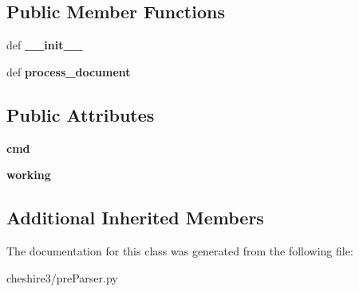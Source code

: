 \subsection*{Public Member Functions}
\begin{DoxyCompactItemize}
\item 
\hypertarget{classcheshire3_1_1pre_parser_1_1_cmd_line_pre_parser_abc296d8b820bf282d1ac0fb5aa224ddd}{def {\bfseries \-\_\-\-\_\-init\-\_\-\-\_\-}}\label{classcheshire3_1_1pre_parser_1_1_cmd_line_pre_parser_abc296d8b820bf282d1ac0fb5aa224ddd}

\item 
\hypertarget{classcheshire3_1_1pre_parser_1_1_cmd_line_pre_parser_a0740fec046170f5ad93fe70a5305cda0}{def {\bfseries process\-\_\-document}}\label{classcheshire3_1_1pre_parser_1_1_cmd_line_pre_parser_a0740fec046170f5ad93fe70a5305cda0}

\end{DoxyCompactItemize}
\subsection*{Public Attributes}
\begin{DoxyCompactItemize}
\item 
\hypertarget{classcheshire3_1_1pre_parser_1_1_cmd_line_pre_parser_ab8772ac4a2d92a5f1d38520137b68496}{{\bfseries cmd}}\label{classcheshire3_1_1pre_parser_1_1_cmd_line_pre_parser_ab8772ac4a2d92a5f1d38520137b68496}

\item 
\hypertarget{classcheshire3_1_1pre_parser_1_1_cmd_line_pre_parser_a0169131d181883e27c9d39aa4e067315}{{\bfseries working}}\label{classcheshire3_1_1pre_parser_1_1_cmd_line_pre_parser_a0169131d181883e27c9d39aa4e067315}

\end{DoxyCompactItemize}
\subsection*{Additional Inherited Members}


The documentation for this class was generated from the following file\-:\begin{DoxyCompactItemize}
\item 
cheshire3/pre\-Parser.\-py\end{DoxyCompactItemize}
